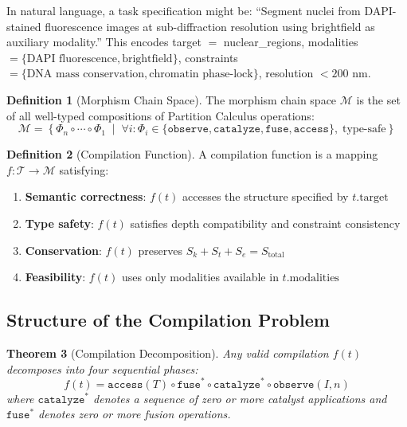 \documentclass[11pt,a4paper]{article}
\newtheorem{theorem}{Theorem}[section]
\theoremstyle{definition}
\newtheorem{definition}[theorem]{Definition}
\theoremstyle{remark}
\newcommand{\Sk}{S_k}
\newcommand{\St}{S_t}
\newcommand{\Se}{S_e}
\newcommand{\morphism}{\Phi}
\begin{document}
In natural language, a task specification might be: ``Segment nuclei from DAPI-stained fluorescence images at sub-diffraction resolution using brightfield as auxiliary modality.'' This encodes target $=$ nuclear\_regions, modalities $= \{\text{DAPI fluorescence}, \text{brightfield}\}$, constraints $= \{\text{DNA mass conservation}, \text{chromatin phase-lock}\}$, resolution $< 200$ nm.

\begin{definition}[Morphism Chain Space]
\label{def:chain_space}
The morphism chain space $\mathcal{M}$ is the set of all well-typed compositions of Partition Calculus operations:
\begin{equation}
\mathcal{M} = \left\{ \morphism_n \circ \cdots \circ \morphism_1 \;\middle|\; \forall i: \morphism_i \in \{\texttt{observe}, \texttt{catalyze}, \texttt{fuse}, \texttt{access}\}, \; \text{type-safe} \right\}
\end{equation}
\end{definition}

\begin{definition}[Compilation Function]
A compilation function is a mapping $f: \mathcal{T} \to \mathcal{M}$ satisfying:
\begin{enumerate}
    \item \textbf{Semantic correctness}: $f(t)$ accesses the structure specified by $t.\text{target}$
    \item \textbf{Type safety}: $f(t)$ satisfies depth compatibility and constraint consistency
    \item \textbf{Conservation}: $f(t)$ preserves $\Sk + \St + \Se = S_{\mathrm{total}}$
    \item \textbf{Feasibility}: $f(t)$ uses only modalities available in $t.\text{modalities}$
\end{enumerate}
\end{definition}

\subsection{Structure of the Compilation Problem}

\begin{theorem}[Compilation Decomposition]
\label{thm:decomposition}
Any valid compilation $f(t)$ decomposes into four sequential phases:
\begin{equation}
f(t) = \texttt{access}(T) \circ \texttt{fuse}^* \circ \texttt{catalyze}^* \circ \texttt{observe}(I, n)
\end{equation}
where $\texttt{catalyze}^*$ denotes a sequence of zero or more catalyst applications and $\texttt{fuse}^*$ denotes zero or more fusion operations.
\end{theorem}
\end{document}
